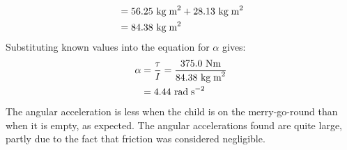\documentclass[a4paper]{article}
\newcommand\radss{\text{ rad\;s}^{-2}}
\newcommand\Nm{\text{ Nm}}
\newcommand\kgmm{\text{ kg\;m}^{2}}
\begin{document}
\begin{shaded}
\begin{enumerate}
\begin{align*}
            &= 56.25\kgmm + 28.13\kgmm\\
            &= 84.38\kgmm
        \end{align*}
        Substituting known values into the equation for $\alpha$ gives:
        \begin{align*}
            \alpha &= \frac{\tau}{I} = \frac{375.0\Nm}{84.38\kgmm}\\
            &= 4.44\radss
        \end{align*}
        The angular acceleration is less when the child is on the merry-go-round than when it is empty, as expected. The angular accelerations found are quite large, partly due to the fact that friction was considered negligible.
    \end{enumerate}
\end{shaded}
\end{document}
